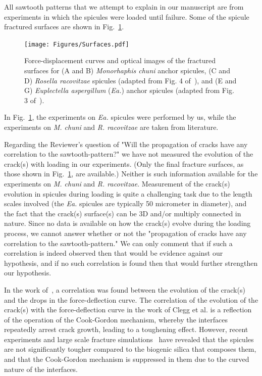 \documentclass[11pt,letterpaper]{report}
\begin{document}
\begin{enumerate}[label=\textit{1.\arabic*},wide, labelwidth=!, labelindent=0pt]
\begin{enumerate}[label=\textit{2.\arabic*},wide, labelindent=0pt]
All  sawtooth patterns that we attempt to explain in our manuscript are from experiments in which the spicules were loaded until failure. Some of the spicule
 fractured surfaces are shown in Fig.~\ref{fig:Surfaces}.

\begin{figure}[H]
\centering
\texttt{[image: Figures/Surfaces.pdf]}
\caption{Force-displacement curves and optical images of the fractured surfaces for (A and B) \textit{Monorhaphis chuni} anchor spicules, (C and D) \textit{Rosella racovitzae} spicules (adapted from Fig. 4 of~\citet{kochiyama2021sawtooth}), and (E and G) \textit{Euplectella aspergillum} (\textit{Ea.}) anchor spicules (adapted from Fig. 3 of~\citet{monn2017enhanced}).
}
\label{fig:Surfaces}
\end{figure}

In Fig.~\ref{fig:Surfaces}, the experiments on \textit{Ea.} spicules were performed by us, while the experiments on \textit{M. chuni} and \textit{R. racovitzae} are taken from literature.


Regarding the Reviewer's question of "Will the propagation of cracks have any correlation to the sawtooth-pattern?" we have not measured the evolution of the crack(s) with loading in our experiments. (Only the final fracture surfaces, as those shown in Fig.~\ref{fig:Surfaces}, are available.) Neither is such information available for the experiments on \textit{M. chuni} and \textit{R. racovitzae}. Measurement of the crack(s) evolution in spicules during loading is quite a challenging task due to the length scales involved (the \textit{Ea.} spicules are typically 50 micrometer in diameter), and the fact that the crack(s) surface(s) can be 3D and/or multiply connected in nature. Since no data is available on how the crack(s) evolve during the loading process, we cannot answer whether or not the "propagation of cracks have any correlation to the sawtooth-pattern." We can only comment that if such a correlation is indeed observed then that would be evidence against our hypothesis, and if no such correlation is found then that would further strengthen our hypothesis.

In the work of~\citet{clegg1990simple}, a correlation was found between the evolution of the crack(s) and the drops in the force-deflection curve. The correlation of the evolution of the crack(s) with the force-deflection curve in the work of Clegg et al. is a reflection of the operation of the Cook-Gordon mechanism, whereby the interfaces repeatedly arrest crack growth, leading to a toughening effect. However, recent experiments and large scale fracture simulations~\cite{monn2020lamellar} have revealed that the spicules are not significantly tougher compared to the biogenic silica that composes them, and that the Cook-Gordon mechanism is suppressed in them due to the curved nature of the interfaces.


\end{enumerate}
\end{enumerate}
\end{document}
